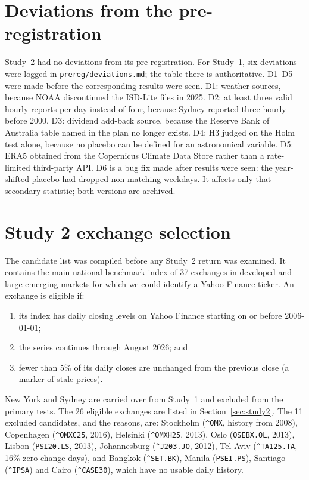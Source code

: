 \documentclass[11pt]{article}
\begin{document}
\clearpage
\section{Deviations from the pre-registration}
Study~2 had no deviations from its pre-registration. For Study~1, six deviations were logged in \texttt{prereg/deviations.md}; the table there is authoritative.
D1--D5 were made before the corresponding results were seen. D1: weather sources, because NOAA
discontinued the ISD-Lite files in 2025. D2: at least three valid hourly reports per day instead of
four, because Sydney reported three-hourly before 2000. D3: dividend add-back source, because the
Reserve Bank of Australia table named in the plan no longer exists. D4: H3 judged on the Holm test
alone, because no placebo can be defined for an astronomical variable. D5: ERA5 obtained from the
Copernicus Climate Data Store rather than a rate-limited third-party API. D6 is a bug fix made after
results were seen: the year-shifted placebo had dropped non-matching weekdays. It affects only that
secondary statistic; both versions are archived.

\clearpage
\section{Study 2 exchange selection}
\label{app:exchanges}

The candidate list was compiled before any Study~2 return was examined. It contains the main
national benchmark index of 37 exchanges in developed and large emerging markets for which we
could identify a Yahoo Finance ticker. An exchange is eligible if:
\begin{enumerate}
\item its index has daily closing levels on Yahoo Finance starting on or before 2006-01-01;
\item the series continues through August 2026; and
\item fewer than 5\% of its daily closes are unchanged from the previous close (a marker of stale
prices).
\end{enumerate}
New York and Sydney are carried over from Study~1 and excluded from the primary tests. The
26 eligible exchanges are listed in Section~\ref{sec:study2}. The 11 excluded candidates, and the
reasons, are: Stockholm (\texttt{\^{}OMX}, history from 2008), Copenhagen (\texttt{\^{}OMXC25},
2016), Helsinki (\texttt{\^{}OMXH25}, 2013), Oslo (\texttt{OSEBX.OL}, 2013), Lisbon
(\texttt{PSI20.LS}, 2013), Johannesburg (\texttt{\^{}J203.JO}, 2012), Tel Aviv
(\texttt{\^{}TA125.TA}, 16\% zero-change days), and Bangkok (\texttt{\^{}SET.BK}), Manila
(\texttt{PSEI.PS}), Santiago (\texttt{\^{}IPSA}) and Cairo (\texttt{\^{}CASE30}), which have no usable
daily history.
\end{document}

